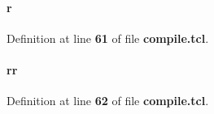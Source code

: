 \paragraph[{r}]{\setlength{\rightskip}{0pt plus 5cm}r}\label{tx__path__top_2bit__unpack_2compile_8tcl_a514f1b439f404f86f77090fa9edc96ce}


Definition at line {\bf 61} of file {\bf compile.\+tcl}.

\paragraph[{rr}]{\setlength{\rightskip}{0pt plus 5cm}rr}\label{tx__path__top_2bit__unpack_2compile_8tcl_aeb9279982226a42afdf2860dbdc29b45}


Definition at line {\bf 62} of file {\bf compile.\+tcl}.

